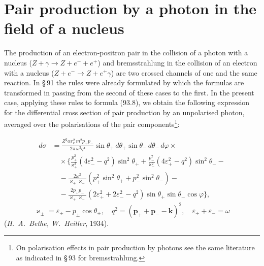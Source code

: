 
\section{Pair production by a photon in the field of a nucleus}


The production of an electron-positron pair in the collision of a photon with a nucleus ($Z + \gamma \to Z + e^- + e^+$) and bremsstrahlung in the collision of an electron with a nucleus ($Z + e^- \to Z + e^+\gamma$) are two crossed channels of one and the same reaction. In \S\,91 the rules were already formulated by which the formulas are transformed in passing from the second of these cases to the first. In the present case, applying these rules to formula (93.8), we obtain the following expression for the differential cross section of pair production by an unpolarised photon, averaged over the polarisations of the pair components\footnote{On polarisation effects in pair production by photons see the same literature as indicated in \S\,93 for bremsstrahlung.}:


\begin{equation}
\begin{split}
d\sigma &= \frac{Z^2\alpha r_\mathrm{e}^2\,m^2 p_+ p_-}{2\pi\,\omega^3 q^4}\sin\theta_+\,d\theta_+\sin\theta_-\,d\theta_-\,d\varphi \times {} \\
&\quad \times \biggl\{\frac{p_+^2}{\varkappa_+^2}(4\varepsilon_-^2 - q^2)\sin^2\theta_+ + \frac{p_-^2}{\varkappa_-^2}(4\varepsilon_+^2 - q^2)\sin^2\theta_- - {} \\
&\quad {} - \frac{2\omega^2}{\varkappa_+\varkappa_-}(p_+^2\sin^2\theta_+ + p_-^2\sin^2\theta_-) - {} \\
&\quad {} - \frac{2p_+p_-}{\varkappa_+\varkappa_-}(2\varepsilon_+^2 + 2\varepsilon_-^2 - q^2)\sin\theta_+\sin\theta_-\cos\varphi\biggr\},
\end{split}
\label{eq:94.1}
\end{equation}
\[
\varkappa_\pm = \varepsilon_\pm - p_\pm\cos\theta_\pm, \quad q^2 = (\mathbf{p}_+ + \mathbf{p}_- - \mathbf{k})^2, \quad \varepsilon_+ + \varepsilon_- = \omega
\]
(\emph{H.~A.~Bethe, W.~Heitler}, 1934).

